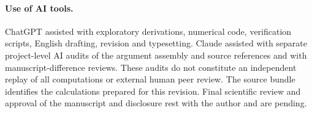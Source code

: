 \paragraph{Use of AI tools.}
ChatGPT assisted with exploratory derivations, numerical code, verification scripts, English drafting, revision and typesetting. Claude assisted with separate project-level AI audits of the argument assembly and source references and with manuscript-difference reviews. These audits do not constitute an independent replay of all computations or external human peer review. The source bundle identifies the calculations prepared for this revision. Final scientific review and approval of the manuscript and disclosure rest with the author and are pending.
